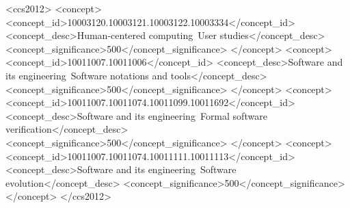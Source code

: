 \documentclass[sigplan,screen]{acmart}\settopmatter{}
\newcommand\toolname{\textsc{REPLica}\xspace}
\begin{document}
\begin{abstract}
Proof engineering tools make it easier to develop
and maintain large systems verified using interactive theorem provers. 
Developing useful proof engineering tools hinges on
understanding the development processes of proof engineers.
This paper breaks down one barrier to achieving that understanding: 
remotely collecting granular data on proof developments as they happen.

We have built a tool called \toolname that instruments Coq's interaction model
in order to collect fine-grained data on proof developments.
It is decoupled from the user interface, and designed in a way that
generalizes to other interactive theorem provers with similar 
interaction models.

We have used \toolname to collect data over the span of a month from a group
of intermediate through expert proof engineers---enough data to reconstruct
hundreds of interactive sessions.
The data reveals patterns in fixing proofs and in changing
programs and specifications useful for the improvement of proof
engineering tools.
Our experiences conducting this study suggest design considerations
both at the level of the study and at the level of the interactive theorem
prover that can facilitate future studies of this kind.
\end{abstract}


\begin{CCSXML}
<ccs2012>
<concept>
<concept_id>10003120.10003121.10003122.10003334</concept_id>
<concept_desc>Human-centered computing~User studies</concept_desc>
<concept_significance>500</concept_significance>
</concept>
<concept>
<concept_id>10011007.10011006</concept_id>
<concept_desc>Software and its engineering~Software notations and tools</concept_desc>
<concept_significance>500</concept_significance>
</concept>
<concept>
<concept_id>10011007.10011074.10011099.10011692</concept_id>
<concept_desc>Software and its engineering~Formal software verification</concept_desc>
<concept_significance>500</concept_significance>
</concept>
<concept>
<concept_id>10011007.10011074.10011111.10011113</concept_id>
<concept_desc>Software and its engineering~Software evolution</concept_desc>
<concept_significance>500</concept_significance>
</concept>
</ccs2012>
\end{CCSXML}
\end{document}
